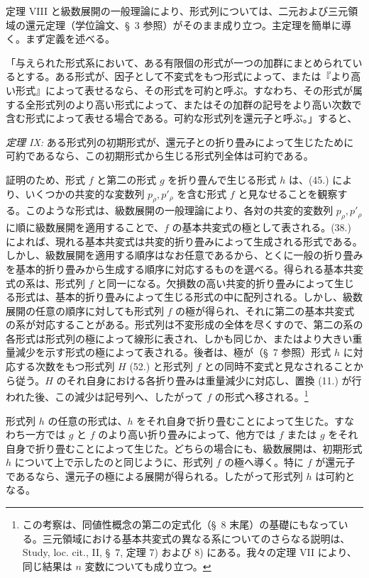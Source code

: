 \documentclass[11pt]{article}
\begin{document}
定理 VIII と級数展開の一般理論により、形式列については、二元および三元領域の還元定理（学位論文、\S\ 3 参照）がそのまま成り立つ。主定理を簡単に導く。まず定義を述べる。

「与えられた形式系において、ある有限個の形式が一つの加群にまとめられているとする。ある形式が、因子として不変式をもつ形式によって、または『より高い形式』によって表せるなら、その形式を可約と呼ぶ。すなわち、その形式が属する全形式列のより高い形式によって、またはその加群の記号をより高い次数で含む形式によって表せる場合である。可約な形式列を還元子と呼ぶ。」すると、

\emph{定理 IX:} ある形式列の初期形式が、還元子との折り畳みによって生じたために可約であるなら、この初期形式から生じる形式列全体は可約である。

証明のため、形式 $f$ と第二の形式 $g$ を折り畳んで生じる形式 $h$ は、(45.) により、いくつかの共変的な変数列 $p_\rho,p'_\rho$ を含む形式 $f$ と見なせることを観察する。このような形式は、級数展開の一般理論により、各対の共変的変数列 $p_\rho,p'_\rho$ に順に級数展開を適用することで、$f$ の基本共変式の極として表される。(38.) によれば、現れる基本共変式は共変的折り畳みによって生成される形式である。しかし、級数展開を適用する順序はなお任意であるから、とくに一般の折り畳みを基本的折り畳みから生成する順序に対応するものを選べる。得られる基本共変式の系は、形式列 $f$ と同一になる。欠損数の高い共変的折り畳みによって生じる形式は、基本的折り畳みによって生じる形式の中に配列される。しかし、級数展開の任意の順序に対しても形式列 $f$ の極が得られ、それに第二の基本共変式の系が対応することがある。形式列は不変形成の全体を尽くすので、第二の系の各形式は形式列の極によって線形に表され、しかも同じか、またはより大きい重量減少を示す形式の極によって表される。後者は、極が（\S\ 7 参照）形式 $h$ に対応する次数をもつ形式列 $H$ (52.) と形式列 $f$ との同時不変式と見なされることから従う。$H$ のそれ自身における各折り畳みは重量減少に対応し、置換 (11.) が行われた後、この減少は記号列へ、したがって $f$ の形式へ移される。\footnote{この考察は、同値性概念の第二の定式化（\S\ 8 末尾）の基礎にもなっている。三元領域における基本共変式の異なる系についてのさらなる説明は、Study, loc. cit., II, \S\ 7, 定理 7) および 8) にある。我々の定理 VII により、同じ結果は $n$ 変数についても成り立つ。}

形式列 $h$ の任意の形式は、$h$ をそれ自身で折り畳むことによって生じた。すなわち一方では $g$ と $f$ のより高い折り畳みによって、他方では $f$ または $g$ をそれ自身で折り畳むことによって生じた。どちらの場合にも、級数展開は、初期形式 $h$ について上で示したのと同じように、形式列 $f$ の極へ導く。特に $f$ が還元子であるなら、還元子の極による展開が得られる。したがって形式列 $h$ は可約となる。
\end{document}
